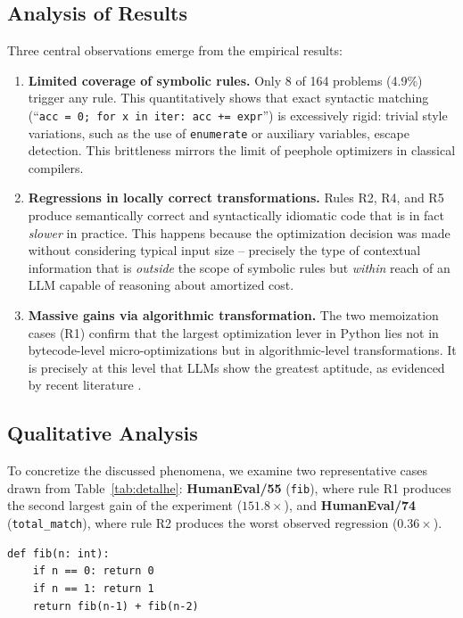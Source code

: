 \documentclass[conference]{IEEEtran}
\begin{document}
\subsection{Analysis of Results}

Three central observations emerge from the empirical results:

\begin{enumerate}
  \item \textbf{Limited coverage of symbolic rules.} Only 8 of 164 problems (4.9\%) trigger any rule. This quantitatively shows that exact syntactic matching (``\texttt{acc = 0; for x in iter: acc += expr}'') is excessively rigid: trivial style variations, such as the use of \texttt{enumerate} or auxiliary variables, escape detection. This brittleness mirrors the limit of peephole optimizers in classical compilers.
  \item \textbf{Regressions in locally correct transformations.} Rules R2, R4, and R5 produce semantically correct and syntactically idiomatic code that is in fact \textit{slower} in practice. This happens because the optimization decision was made without considering typical input size -- precisely the type of contextual information that is \textit{outside} the scope of symbolic rules but \textit{within} reach of an LLM capable of reasoning about amortized cost.
  \item \textbf{Massive gains via algorithmic transformation.} The two memoization cases (R1) confirm that the largest optimization lever in Python lies not in bytecode-level micro-optimizations but in algorithmic-level transformations. It is precisely at this level that LLMs show the greatest aptitude, as evidenced by recent literature \cite{DBLP:journals/corr/abs-2302-07867,DBLP:journals/corr/abs-2309-07062}.
\end{enumerate}

\subsection{Qualitative Analysis}
To concretize the discussed phenomena, we examine two representative cases drawn from Table~\ref{tab:detalhe}: \textbf{HumanEval/55} (\texttt{fib}), where rule R1 produces the second largest gain of the experiment ($151.8\times$), and \textbf{HumanEval/74} (\texttt{total\_match}), where rule R2 produces the worst observed regression ($0.36\times$).

\par\medskip\noindent
\begin{minipage}{\columnwidth}
\begin{lstlisting}[caption={Original \texttt{fib} (HumanEval/55).}, label={lst:fib_orig}]
def fib(n: int):
    if n == 0: return 0
    if n == 1: return 1
    return fib(n-1) + fib(n-2)
\end{lstlisting}
\end{minipage}\par\medskip
\end{document}
